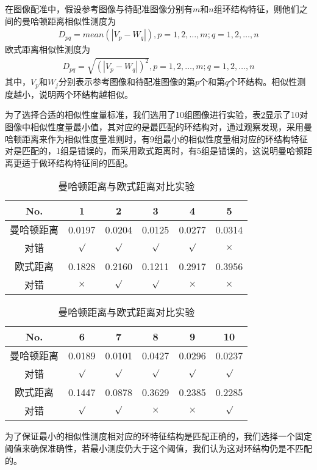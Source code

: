 在图像配准中，假设参考图像与待配准图像分别有$m$和$n$组环结构特征，则他们之间的曼哈顿距离相似性测度为
\begin{align}
D_{pq} = mean(|V_p-W_q|), p = 1, 2, \ldots, m; q = 1, 2, \ldots, n
\end{align}
欧式距离相似性测度为
\begin{align}
D_{pq} = \sqrt{(|V_p-W_q|)^2}, p = 1, 2, \ldots, m; q = 1, 2, \ldots, n
\end{align}
其中，$V_p$和$W_j$分别表示参考图像和待配准图像的第$p$个和第$q$个环结构。相似性测度越小，说明两个环结构越相似。

为了选择合适的相似性度量标准，我们选用了10组图像进行实验，表\ref{table:similarity}显示了10对图像中相似性度量最小值，其对应的是最匹配的环结构对，通过观察发现，采用曼哈顿距离来作为相似性度量准则时，有9组最小的相似性度量相对应的环结构特征对是匹配的，1组是错误的，而采用欧式距离时，有5组是错误的，这说明曼哈顿距离更适于做环结构特征间的匹配。

\begin{table}[H]
\caption{曼哈顿距离与欧式距离对比实验}
\centering
\begin{tabular}{cccccc}
\hline
\rowcolor{gray!50}
No. & 1  & 2 & 3 & 4 & 5 \\
\hline
曼哈顿距离 & 0.0197 & 0.0204 & 0.0125 & 0.0277 & 0.0314 \\
\rowcolor{gray!50}
对错 & $\surd$ & $\surd$ & $\surd$ & $\surd$ & $\times$ \\
欧式距离 & 0.1828 & 0.2160 & 0.1211 & 0.2917 & 0.3956 \\
\rowcolor{gray!50}
对错 & $\times$ & $\surd$ & $\surd$ & $\times$& $\times$\\
\hline
\end{tabular}
\begin{tabular}{cccccc}
\hline
\rowcolor{gray!50}
No. &  6 & 7 & 8 & 9 & 10\\
\hline
曼哈顿距离 & 0.0189 & 0.0101 & 0.0427 &0.0296 &0.0237  \\
\rowcolor{gray!50}
对错 & $\surd$ & $\surd$ & $\surd$ & $\surd$ & $\surd$ \\
欧式距离 &0.1447 & 0.0878 & 0.3629 & 0.2385 & 0.2285\\
\rowcolor{gray!50}
对错 & $\surd$ & $\surd$ & $\times$ & $\times$ & $\surd$ \\
\hline
\end{tabular}
\label{table:similarity}
\end{table}

为了保证最小的相似性测度相对应的环特征结构是匹配正确的，我们选择一个固定阈值来确保准确性，若最小测度仍大于这个阈值，我们认为这对环结构仍是不匹配的。

